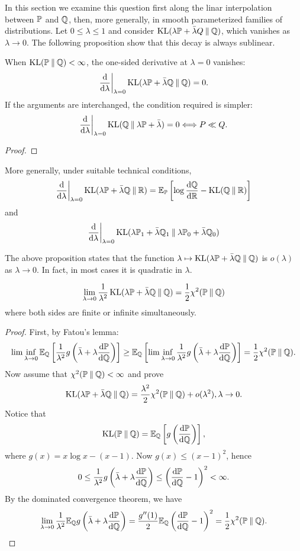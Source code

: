 In this section we examine this question first along the linar interpolation between $\mathbb{P}$ and $\mathbb{Q}$, then, more generally, in smooth parameterized families of distributions.
Let $0\leq \lambda\leq 1$ and consider $\operatorname{KL}(\lambda\mathbb{P}+\bar{\lambda}Q\mathbin{\|}\mathbb{Q})$, which vanishes as $\lambda\to 0$.
The following proposition show that this decay is always sublinear.
\begin{proposition}
    When $\operatorname{KL}(\mathbb{P}\mathbin{\|}\mathbb{Q})<\infty$, the one-sided derivative at $\lambda=0$ vanishes:
    \[\frac{\mathrm{d}}{\mathrm{d}\lambda}\bigg\vert_{\lambda=0}\operatorname{KL}(\lambda\mathbb{P}+\bar{\lambda}\mathbb{Q}\mathbin{\|}\mathbb{Q})=0.\]
    If the arguments are interchanged, the condition required is simpler:
    \[\frac{\mathrm{d}}{\mathrm{d}\lambda}\bigg\vert_{\lambda=0}\operatorname{KL}(\mathbb{Q}\mathbin{\|} \lambda\mathbb{P}+\bar{\lambda})=0\Longleftrightarrow P\ll Q.\]
\end{proposition}
\begin{proof}
    
\end{proof}
\begin{remark}
    More generally, under suitable technical conditions,
    \[\frac{\mathrm{d}}{\mathrm{d}\lambda}\bigg\vert_{\lambda=0}\operatorname{KL}(\lambda\mathbb{P}+\bar{\lambda}\mathbb{Q}\mathbin{\|}\mathbb{R})=\mathbb{E}_{\mathbb{P}}\left[\log\frac{\mathrm{d}\mathbb{Q}}{\mathrm{d}\mathbb{R}}-\operatorname{KL}(\mathbb{Q}\mathbin{\|}\mathbb{R})\right]\]
    and 
    \[\frac{\mathrm{d}}{\mathrm{d}\lambda}\bigg\vert_{\lambda=0}\operatorname{KL}(\lambda\mathbb{P}_1+\bar{\lambda}\mathbb{Q}_1\mathbin{\|} \lambda\mathbb{P}_0+\bar{\lambda}\mathbb{Q}_0)\]
\end{remark}

The above proposition states that the function $\lambda\mapsto \operatorname{KL}(\lambda\mathbb{P}+\bar{\lambda}\mathbb{Q}\mathbin{\|}\mathbb{Q})$ is $o(\lambda)$ as $\lambda\to 0$.
In fact, in most cases it is quadratic in $\lambda$.
\begin{proposition}
    \[\lim_{\lambda\to 0}\frac{1}{\lambda^2}\operatorname{KL}(\lambda\mathbb{P}+\bar{\lambda}\mathbb{Q}\mathbin{\|}\mathbb{Q})=\frac{1}{2}\chi^2(\mathbb{P}\mathbin{\|}\mathbb{Q})\]
    where both sides are finite or infinite simultaneously.
\end{proposition}
\begin{proof}
    First, by Fatou's lemma:
    \[\lim\inf_{\lambda\to 0}\mathbb{E}_{\mathbb{Q}}\left[ \frac{1}{\lambda^2}g\left(\bar{\lambda}+\lambda\frac{\mathrm{d}\mathbb{P}}{\mathrm{d}\mathbb{Q}}\right)\right]\geq \mathbb{E}_{\mathbb{Q}}\left[\lim\inf_{\lambda\to 0}\frac{1}{\lambda^2}g\left(\bar{\lambda}+\lambda\frac{\mathrm{d}\mathbb{P}}{\mathrm{d}\mathbb{Q}}\right)\right]=\frac{1}{2}\chi^2(\mathbb{P}\mathbin{\|}\mathbb{Q}).\]
    Now assume that $\chi^2(\mathbb{P}\mathbin{\|}\mathbb{Q})<\infty$ and prove
    \[\operatorname{KL}(\lambda\mathbb{P}+\bar{\lambda}\mathbb{Q}\mathbin{\|}\mathbb{Q})=\frac{\lambda^2}{2}\chi^2(\mathbb{P}\mathbin{\|}\mathbb{Q})+o(\lambda^2),\lambda\to 0.\]
    Notice that 
    \[\operatorname{KL}(\mathbb{P}\mathbin{\|}\mathbb{Q})=\mathbb{E}_{\mathbb{Q}}\left[g\left(\frac{\mathrm{d}\mathbb{P}}{\mathrm{d}\mathbb{Q}}\right)\right],\]
    where $g(x)=x\log x - (x-1)$. Now $g(x)\leq (x-1)^2$, hence 
    \[0\leq \frac{1}{\lambda^2}g\left(\bar{\lambda}+\lambda\frac{\mathrm{d}\mathbb{P}}{\mathrm{d}\mathbb{Q}}\right)\leq \left(\frac{\mathrm{d}\mathbb{P}}{\mathrm{d}\mathbb{Q}}-1\right)^2<\infty.\]
    By the dominated convergence theorem, we have
    \[\lim_{\lambda\to 0}\frac{1}{\lambda^2}\mathbb{E}_{\mathbb{Q}} g\left(\bar{\lambda}+\lambda\frac{\mathrm{d}\mathbb{P}}{\mathrm{d}\mathbb{Q}}\right)=\frac{g''(1)}{2}\mathbb{E}_{\mathbb{Q}}\left(\frac{\mathrm{d}\mathbb{P}}{\mathrm{d}\mathbb{Q}}-1\right)^2=\frac{1}{2}\chi^2(\mathbb{P}\mathbin{\|}\mathbb{Q}).\]
\end{proof}



